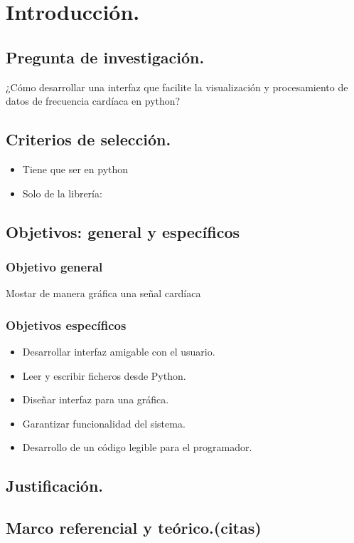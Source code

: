 \documentclass[14pt]{report}
\begin{document}
	\section{Introducción.}
		\subsection*{Pregunta de investigación.}
		¿Cómo desarrollar una interfaz que facilite la visualización y procesamiento de datos de frecuencia cardíaca en python? 
		\subsection*{Criterios de selección.}
		\begin{itemize}
			\item Tiene que ser en python
			\item Solo de la librería: 
		\end{itemize}
		\subsection*{Objetivos: general y específicos}
			\subsubsection{Objetivo general}
			Mostar de manera gráfica una señal cardíaca
			\subsubsection{Objetivos específicos}
				\begin{itemize}
					\item Desarrollar interfaz amigable con el usuario.
					\item Leer y escribir ficheros desde Python. 
					\item Diseñar interfaz para una gráfica. 
					\item Garantizar funcionalidad del sistema. 
					\item Desarrollo de un código legible para el programador. 
				\end{itemize}
		\subsection*{Justificación.}
		\subsection*{Marco referencial y teórico.(citas)}
\end{document}

